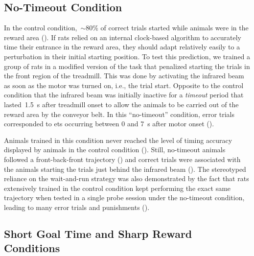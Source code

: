 \subsection{No-Timeout Condition}
\label{ch:time:nto}

In the control condition,~$\sim$80\% of correct trials started while animals were in the reward area ().
If rats relied on an internal clock-based algorithm to accurately time their entrance in the reward area, they should adapt relatively easily to a perturbation in their initial starting position.
To test this prediction, we trained a group of rats in a modified version of the task that penalized starting the trials in the front region of the treadmill.
This was done by activating the infrared beam as soon as the motor was turned on, i.e., the trial start.
Opposite to the control condition that the infrared beam was initially inactive for a \emph{timeout} period that lasted~1.5~s after treadmill onset to allow the animals to be carried out of the reward area by the conveyor belt.
In this ``no-timeout'' condition, error trials corresponded to \glspl{et} occurring between 0 and 7~s after motor onset ().

Animals trained in this condition never reached the level of timing accuracy displayed by animals in the control condition ().
Still, no-timeout animals followed a front-back-front trajectory () and correct trials were associated with the animals starting the trials just behind the infrared beam ().
The stereotyped reliance on the wait-and-run strategy was also demonstrated by the fact that rats extensively trained in the control condition kept performing the exact same trajectory when tested in a single probe session under the no-timeout condition, leading to many error trials and punishments ().


\subsection[Short~GT \& Sharp Conditions]{Short Goal Time and Sharp Reward Conditions}
\label{ch:time:shortGT}

